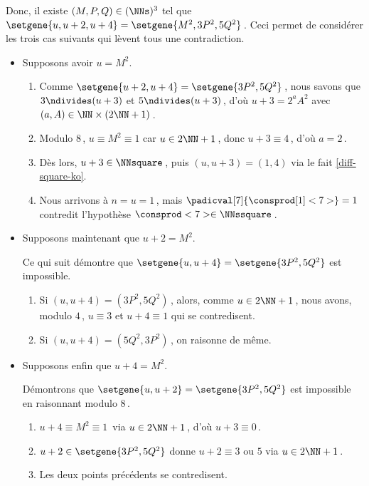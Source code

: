 Donc, il existe $(M, P, Q) \in ( \NNs )^3$ tel que 
$\setgene{u, u + 2, u + 4} = \setgene{M^2, 3P^2, 5Q^2}$\,.
Ceci permet de considérer les trois cas suivants qui lèvent tous une contradiction.
\begin{itemize}
	\item Supposons avoir $u = M^2$.
	\begin{enumerate}
		\item Comme $\setgene{u + 2, u + 4} = \setgene{3P^2, 5Q^2}$\,, nous savons que $3 \ndivides (u + 3)$ et $5 \ndivides (u + 3)$\,, d'où $u + 3 = 2^a A^2$ avec $(a, A) \in \NN \times (2\NN + 1)$\,.

		\item Modulo $8$\,, $u \equiv M^2 \equiv 1$ car $u \in 2 \NN + 1$\,,
		donc $u + 3 \equiv 4$\,, d'où $a = 2$\,.

		\item Dès lors, $u + 3 \in \NNsquare$\,, puis $(u, u + 3) = (1, 4)$ via le fait \ref{diff-square-ko}.

		\item Nous arrivons à $n = u = 1$\,, mais $\padicval[7]{\consprod[1]<7>} = 1$ contredit l'hypothèse $\consprod<7> \in \NNssquare$\,.
	\end{enumerate}


	\item Supposons maintenant que $u + 2 = M^2$.

	\smallskip
	\noindent
	Ce qui suit démontre que $\setgene{u, u + 4} = \setgene{3P^2, 5Q^2}$ est impossible.
	\begin{enumerate}
		\item Si $(u, u + 4) = (3P^2, 5Q^2)$\,, alors,
		comme $u \in 2 \NN + 1$\,, nous avons, modulo $4$\,,
		$u \equiv 3$
		et
		$u+4 \equiv 1$
		qui se contredisent.

		\item Si $(u, u + 4) = (5Q^2, 3P^2)$\,, on raisonne de même.
	\end{enumerate}


	\item Supposons enfin que $u + 4 = M^2$.

	\smallskip
	\noindent
	Démontrons que $\setgene{u, u + 2} = \setgene{3P^2, 5Q^2}$ est impossible en raisonnant modulo $8$\,.
	\begin{enumerate}
		\item $u + 4 \equiv M^2 \equiv 1$\, via $u \in 2 \NN + 1$\,,
		d'où $u + 3 \equiv 0$\,.

		\item $u + 2 \in \setgene{3P^2, 5Q^2}$ donne $u + 2 \equiv \text{$3$ ou $5$}$  via $u \in 2 \NN + 1$\,.

		\item Les deux points précédents se contredisent. \qedhere
	\end{enumerate}
\end{itemize}